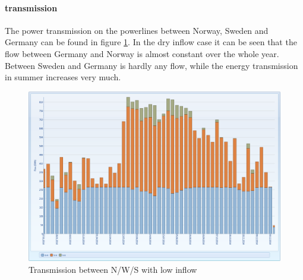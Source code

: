 \documentclass{article}
\begin{document}
\paragraph{transmission\\}
The power transmission on the powerlines between Norway, Sweden and Germany can be found in figure \ref{fig:MTnodetransmissiondry}. In the dry inflow case it can be seen that the flow between Germany and Norway is almost constant over the whole year. Between Sweden and Germany is hardly any flow, while the energy transmission in summer increases very much.
\begin{figure}[htbp]
\begin{center}
\includegraphics[width=13cm,keepaspectratio=true]{figures/drycase/MTnodetransmissiondry}
\caption{Transmission between N/W/S with low inflow}
\label{fig:MTnodetransmissiondry}
\end{center}
\end{figure}
\end{document}
